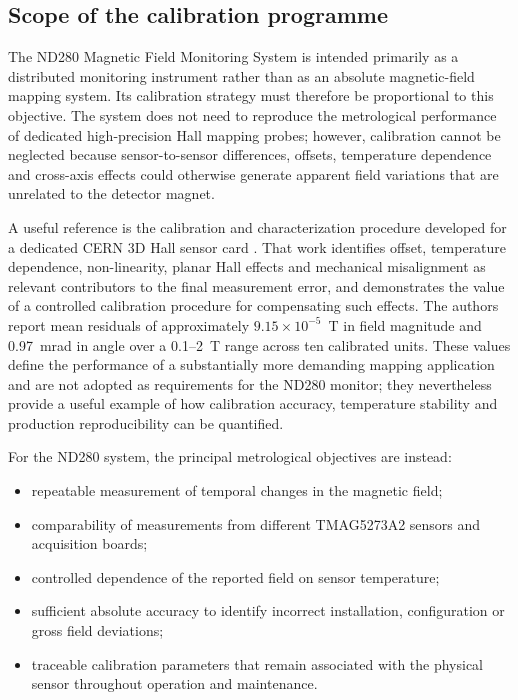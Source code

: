 \subsection{Scope of the calibration programme}

The ND280 Magnetic Field Monitoring System is intended primarily as a distributed monitoring instrument rather than as an absolute magnetic-field mapping system. Its calibration strategy must therefore be proportional to this objective. The system does not need to reproduce the metrological performance of dedicated high-precision Hall mapping probes; however, calibration cannot be neglected because sensor-to-sensor differences, offsets, temperature dependence and cross-axis effects could otherwise generate apparent field variations that are unrelated to the detector magnet.

A useful reference is the calibration and characterization procedure developed for a dedicated CERN 3D Hall sensor card \cite{MessnerHallCalibration}. That work identifies offset, temperature dependence, non-linearity, planar Hall effects and mechanical misalignment as relevant contributors to the final measurement error, and demonstrates the value of a controlled calibration procedure for compensating such effects. The authors report mean residuals of approximately $9.15\times10^{-5}$~T in field magnitude and 0.97~mrad in angle over a 0.1--2~T range across ten calibrated units. These values define the performance of a substantially more demanding mapping application and are not adopted as requirements for the ND280 monitor; they nevertheless provide a useful example of how calibration accuracy, temperature stability and production reproducibility can be quantified.

For the ND280 system, the principal metrological objectives are instead:

\begin{itemize}[leftmargin=*]
\item repeatable measurement of temporal changes in the magnetic field;
\item comparability of measurements from different TMAG5273A2 sensors and acquisition boards;
\item controlled dependence of the reported field on sensor temperature;
\item sufficient absolute accuracy to identify incorrect installation, configuration or gross field deviations;
\item traceable calibration parameters that remain associated with the physical sensor throughout operation and maintenance.
\end{itemize}


